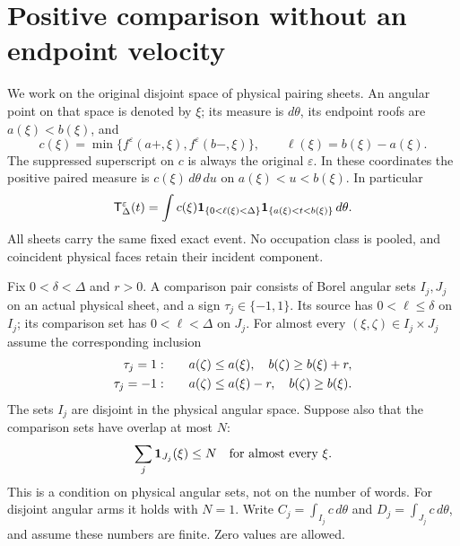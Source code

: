 \section{Positive comparison without an endpoint velocity}
\label{sec:v104-block}
We work on the original disjoint space of physical pairing sheets.
An angular point on that space is denoted by $\xi$; its measure is
$d\theta$, its endpoint roofs are $a(\xi)<b(\xi)$, and
\[
 c(\xi)=\min\{f^\varepsilon(a+,\xi),f^\varepsilon(b-,\xi)\},
 \qquad \ell(\xi)=b(\xi)-a(\xi).
\]
The suppressed superscript on $c$ is always the original $\varepsilon$.
In these coordinates the positive paired measure is
$c(\xi)\,d\theta\,du$ on $a(\xi)<u<b(\xi)$. In particular
\begin{equation}\label{eq:v104-target}
 \mathsf T_\Delta^\varepsilon(t)
 =\int c(\xi)\one_{\{0<\ell(\xi)<\Delta\}}
                \one_{\{a(\xi)<t<b(\xi)\}}\,d\theta.
\end{equation}
All sheets carry the same fixed exact event. No occupation class is
pooled, and coincident physical faces retain their incident component.

Fix $0<\delta<\Delta$ and $r>0$. A comparison pair consists of
Borel angular sets $I_j,J_j$ on an actual physical sheet, and a sign
$\tau_j\in\{-1,1\}$. Its source has $0<\ell\le\delta$ on $I_j$;
its comparison set has $0<\ell<\Delta$ on $J_j$. For almost every
$(\xi,\zeta)\in I_j\times J_j$ assume the corresponding inclusion
\begin{align}
 \tau_j=1:&\qquad a(\zeta)\le a(\xi),\quad
                           b(\zeta)\ge b(\xi)+r,\notag\\
 \tau_j=-1:&\qquad a(\zeta)\le a(\xi)-r,\quad
                           b(\zeta)\ge b(\xi).
                                      \label{eq:v104-inclusion}
\end{align}
The sets $I_j$ are disjoint in the physical angular space. Suppose
also that the comparison sets have overlap at most $N$:
\begin{equation}\label{eq:v104-overlap}
                 \sum_j\one_{J_j}(\xi)\le N
                 \quad\text{for almost every }\xi.
\end{equation}
This is a condition on physical angular sets, not on the number of
words. For disjoint angular arms it holds with $N=1$.
Write $C_j=\int_{I_j}c\,d\theta$ and $D_j=\int_{J_j}c\,d\theta$,
and assume these numbers are finite. Zero values are allowed.

